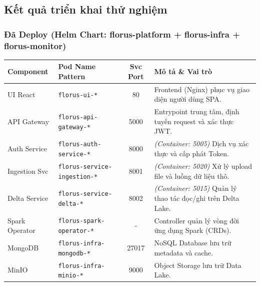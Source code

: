 \subsection{Kết quả triển khai thử nghiệm}

\subsubsection{Đã Deploy (Helm Chart: florus-platform + florus-infra + florus-monitor)}


\begin{table}[H]
    \centering
    \small 
    \renewcommand{\arraystretch}{1.2} 
    \begin{tabularx}{\textwidth}{@{}l l c X@{}}
        \toprule
        \textbf{Component} & \textbf{Pod Name Pattern} & \textbf{Svc Port} & \textbf{Mô tả \& Vai trò} \\
        \midrule
        
        UI React & \texttt{florus-ui-*} & 80 & Frontend (Nginx) phục vụ giao diện người dùng SPA. \\
        
        API Gateway & \texttt{florus-api-gateway-*} & 5000 & Entrypoint trung tâm, định tuyến request và xác thực JWT. \\
        
        Auth Service & \texttt{florus-auth-service-*} & 8000 & \textit{(Container: 5005)} Dịch vụ xác thực và cấp phát Token. \\
        
        Ingestion Svc & \texttt{florus-service-ingestion-*} & 8001 & \textit{(Container: 5020)} Xử lý upload file và luồng dữ liệu thô. \\
        
        Delta Service & \texttt{florus-service-delta-*} & 8002 & \textit{(Container: 5015)} Quản lý thao tác đọc/ghi trên Delta Lake. \\
        
        Spark Operator & \texttt{florus-spark-operator-*} & - & Controller quản lý vòng đời ứng dụng Spark (CRDs). \\
        
        MongoDB & \texttt{florus-infra-mongodb-*} & 27017 & NoSQL Database lưu trữ metadata và cache. \\
        
        MinIO & \texttt{florus-infra-minio-*} & 9000 & Object Storage lưu trữ Data Lake. \\
        

\end{tabularx}
\end{table}
